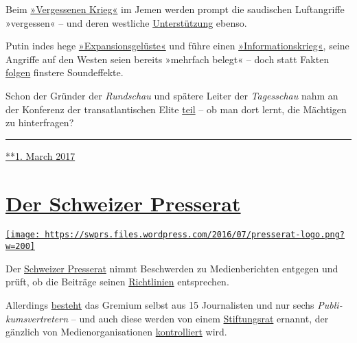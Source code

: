 Beim
\href{https://www.srf.ch/sendungen/rundschau/gehorsam-und-ehelos-klamauk-statt-kompromiss-vergessener-krieg}{»Vergessenen
Krieg«} im Jemen werden prompt die saudischen Luftangriffe »vergessen«
-- und deren westliche
\href{https://www.strategic-culture.org/news/2018/06/18/western-media-whitewash-yemen-genocide.html}{Unterstützung}
ebenso.

Putin indes hege
\href{https://www.srf.ch/sendungen/rundschau/gianni-infantino-fatma-samoura-iv-kosovaren-zittern-vor-russen}{»Expansionsgelüste«}
und füh­re einen
\href{https://www.srf.ch/sendungen/rundschau/putins-informationskrieg-milliarden-jongleur-bastos-camorra}{»Informationskrieg«},
seine Angriffe auf den Westen seien bereits »mehrfach be­legt« -- doch
statt Fakten
\href{https://www.srf.ch/sendungen/rundschau/putins-informationskrieg-milliarden-jongleur-bastos-camorra}{folgen}
finstere Sound­effekte.

Schon der Gründer der \emph{Rundschau} und spätere Leiter der
\emph{Tagesschau} nahm an der Konferenz der trans­atlantischen Elite
\href{https://wikileaks.org/plusd/cables/1978ZURICH00660_d.html}{teil}
-- ob man dort lernt, die Mächtigen zu hinterfragen?

\begin{center}\rule{0.5\linewidth}{\linethickness}\end{center}

\href{https://swprs.org/2017/03/01/srf-rundschau/}{**1. March 2017}

\hypertarget{der-schweizer-presserat}{%
\section{\texorpdfstring{\href{https://swprs.org/2017/03/01/der-schweizer-presserat/}{Der
Schweizer
Presserat}}{Der Schweizer Presserat}}\label{der-schweizer-presserat}}

\href{https://swprs.org/2017/03/01/der-schweizer-presserat/}{\texttt{[image: https://swprs.files.wordpress.com/2016/07/presserat-logo.png?w=200]}}

Der \href{https://presserat.ch/}{Schweizer Presse­rat} nimmt
Be­schwer­den zu Me­dien­be­rich­ten ent­ge­gen und prüft, ob die
Beiträge seinen
\href{https://presserat.ch/journalistenkodex/richtlinien/}{Richt­linien}
ent­spre­chen.

Aller­dings
\href{https://presserat.ch/der-presserat/presseratsmitglieder/}{besteht}
das Gre­mium selbst aus 15 Jour­na­listen und nur sechs
\emph{Pub­li­kums­ver­tre­tern} -- und auch diese werden von einem
\href{https://presserat.ch/der-presserat/stiftungsratsmitglieder/}{Stif‌­tungs­rat}
er­nannt, der gänz­lich von Medien­orga­ni­sa­tionen
\href{https://presserat.ch/der-presserat/geschaeftsreglement/}{kon­trol­liert}
wird.

